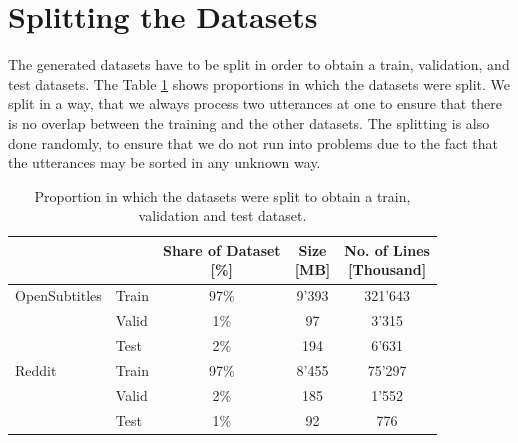 \section{Splitting the Datasets}
\label{data:split_corpus}
The generated datasets have to be split in order to obtain a train, validation, and test datasets. The Table \ref{tbl:data:split:corpus} shows proportions in which the datasets were split. We split in a way, that we always process two utterances at one to ensure that there is no overlap between the training and the other datasets. The splitting is also done randomly, to ensure that we do not run into problems due to the fact that the utterances may be sorted in any unknown way.
\\
\begin{table}[H]
	\centering
	\begin{adjustbox}{max width=\textwidth}
		\centering
		\begin{tabular}{llccc}
			\toprule
			&  \specialcell{Dataset}
			&  \specialcell{Share of Dataset \\ {[\%]}}
			&  \specialcell{Size \\{[MB]}}
			&  \specialcell{No. of Lines \\{[Thousand]}}\\
			\midrule
			OpenSubtitles	& Train	&97\%	&9'393	&321'643	\\
			&Valid	&1\%	&97		&3'315	\\
			&Test	&2\%	&194	&6'631	\\
			\midrule
			Reddit			&Train	&97\%	&8'455	&75'297	\\
			&Valid	&2\%	&185	&1'552	\\
			&Test	&1\%	&92		&776	\\
			\bottomrule
		\end{tabular}
	\end{adjustbox}
	\caption{Proportion in which the datasets were split to obtain a train, validation and test dataset.}
	\label{tbl:data:split:corpus}
\end{table}


